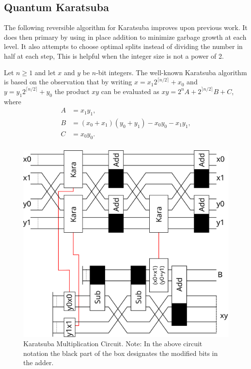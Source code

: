 \subsection{Quantum Karatsuba}
    The following reversible algorithm for Karatsuba improves upon previous work\cite{PF:2006}.
    It does then primary by using in place addition to minimize garbage growth at each level.
    It also attempts to choose optimal splits instead of dividing the number in half at each step,
    This is helpful when the integer size is not a power of 2.

    Let $n\geq 1$ and let $x$ and $y$ be $n$-bit integers.
    The well-known Karatsuba\cite{KO:1963} algorithm is based on the observation that by writing $x=x_1 2^{\lceil n/2\rceil}+x_0$ and $y=y_1 2^{\lceil n/2\rceil }+y_0$ the product $xy$ can be evaluated as $xy=2^n A + 2^{\rceil n/2 \rceil} B + C$, where
    \begin{align*}
      A &= x_1 y_1, \\
      B &= (x_0+x_1)(y_0+y_1) - x_0 y_0 - x_1 y_1,\\
      C &= x_0 y_0. \\
    \end{align*}
    \begin{figure}[ht]
      \capstart
      \centering
      \includegraphics[width=2\textwidth/3]{images/karatsuba2}
      \caption{Karatsuba Multiplication Circuit.
               Note: In the above circuit notation the black part of the box designates the modified bits in the adder.}
      \label{fig:kara2}
     \end{figure}
